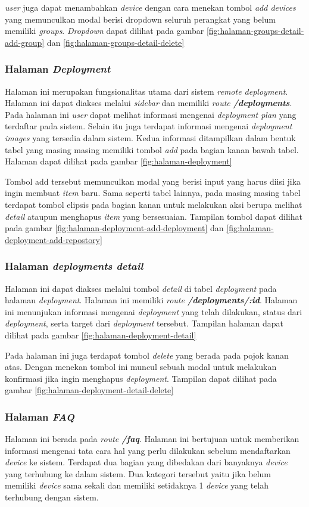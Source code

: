 \textit{user} juga dapat menambahkan \textit{device} dengan cara menekan tombol \textit{add devices} yang memunculkan modal berisi dropdown seluruh perangkat yang belum memiliki \textit{groups}. \textit{Dropdown} dapat dilihat pada gambar \ref{fig:halaman-groups-detail-add-group} dan \ref{fig:halaman-groups-detail-delete}

\subsubsection{Halaman \textit{Deployment}}
Halaman ini merupakan fungsionalitas utama dari sistem \textit{remote deployment}. Halaman ini dapat diakses melalui \textit{sidebar} dan memiliki \textit{route \textbf{/deployments}}. Pada halaman ini \textit{user} dapat melihat informasi mengenai \textit{deployment plan} yang terdaftar pada sistem. Selain itu juga terdapat informasi mengenai \textit{deployment images} yang tersedia dalam sistem. Kedua informasi ditampilkan dalam bentuk tabel yang masing masing memiliki tombol \textit{add} pada bagian kanan bawah tabel. Halaman dapat dilihat pada gambar \ref{fig:halaman-deployment}

Tombol add tersebut memunculkan modal yang berisi input yang harus diisi jika ingin membuat \textit{item} baru. Sama seperti tabel lainnya, pada masing masing tabel terdapat tombol elipsis pada bagian kanan untuk melakukan aksi berupa melihat \textit{detail} ataupun menghapus \textit{item} yang bersesuaian. Tampilan tombol dapat dilihat pada gambar \ref{fig:halaman-deployment-add-deployment} dan \ref{fig:halaman-deployment-add-repostory}

\subsubsection{Halaman \textit{deployments detail}}
Halaman ini dapat diakses melalui tombol \textit{detail} di tabel \textit{deployment} pada halaman \textit{deployment}. Halaman ini memiliki \textit{route \textbf{/deployments/:id}}. Halaman ini menunjukan informasi mengenai \textit{deployment} yang telah dilakukan, status dari \textit{deployment}, serta target dari \textit{deployment} tersebut. Tampilan halaman dapat dilihat pada gambar \ref{fig:halaman-deployment-detail}

Pada halaman ini juga terdapat tombol \textit{delete} yang berada pada pojok kanan atas. Dengan menekan tombol ini muncul sebuah modal untuk melakukan konfirmasi jika ingin menghapus \textit{deployment}. Tampilan dapat dilihat pada gambar \ref{fig:halaman-deployment-detail-delete}

\subsubsection{Halaman \textit{FAQ}}
Halaman ini berada pada \textit{route \textbf{/faq}}. Halaman ini bertujuan untuk memberikan informasi mengenai tata cara hal yang perlu dilakukan sebelum mendaftarkan \textit{device} ke sistem. Terdapat dua bagian yang dibedakan dari banyaknya \textit{device} yang terhubung ke dalam sistem. Dua kategori tersebut yaitu jika belum memiliki \textit{device} sama sekali dan memiliki setidaknya 1 \textit{device} yang telah terhubung dengan sistem.
